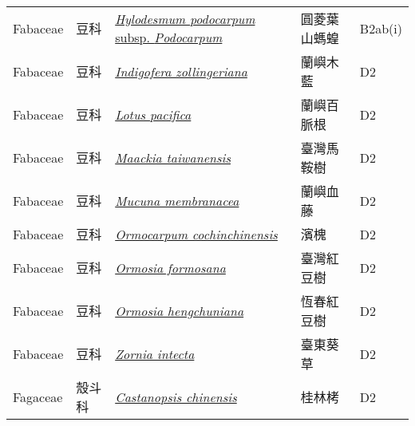 {\begin{longtable}{p{2.5cm}p{2.5cm}p{4.5cm}p{2.5cm}p{3cm}}
    Fabaceae & 豆科 & \href{http://www.theplantlist.org/tpl1.1/search?q=Hylodesmum+podocarpum+subsp.+Podocarpum}{\textit{Hylodesmum podocarpum} subsp. \textit{Podocarpum} } & 圓菱葉山螞蝗 & B2ab(i) \index{Hylodesmum@\textit{Hylodesmum}!podocarpum@\textit{podocarpum}!subsp. Podocarpum@subsp. \textit{Podocarpum}}  \index{圓菱葉山螞蝗} \\
    Fabaceae & 豆科 & \href{http://www.theplantlist.org/tpl1.1/search?q=Indigofera+zollingeriana}{\textit{Indigofera zollingeriana} } & 蘭嶼木藍 & D2 \index{Indigofera@\textit{Indigofera}!zollingeriana@\textit{zollingeriana}}  \index{蘭嶼木藍} \\
    Fabaceae & 豆科 & \href{http://www.theplantlist.org/tpl1.1/search?q=Lotus+pacifica}{\textit{Lotus pacifica} } & 蘭嶼百脈根 & D2 \index{Lotus@\textit{Lotus}!pacifica@\textit{pacifica}}  \index{蘭嶼百脈根} \\
    Fabaceae & 豆科 & \href{http://www.theplantlist.org/tpl1.1/search?q=Maackia+taiwanensis}{\textit{Maackia taiwanensis} } & 臺灣馬鞍樹 & D2 \index{Maackia@\textit{Maackia}!taiwanensis@\textit{taiwanensis}}  \index{臺灣馬鞍樹} \\
    Fabaceae & 豆科 & \href{http://www.theplantlist.org/tpl1.1/search?q=Mucuna+membranacea}{\textit{Mucuna membranacea} } & 蘭嶼血藤 & D2 \index{Mucuna@\textit{Mucuna}!membranacea@\textit{membranacea}}  \index{蘭嶼血藤} \\
    Fabaceae & 豆科 & \href{http://www.theplantlist.org/tpl1.1/search?q=Ormocarpum+cochinchinensis}{\textit{Ormocarpum cochinchinensis} } & 濱槐 & D2 \index{Ormocarpum@\textit{Ormocarpum}!cochinchinensis@\textit{cochinchinensis}}  \index{濱槐} \\
    Fabaceae & 豆科 & \href{http://www.theplantlist.org/tpl1.1/search?q=Ormosia+formosana}{\textit{Ormosia formosana} } & 臺灣紅豆樹 & D2 \index{Ormosia@\textit{Ormosia}!formosana@\textit{formosana}}  \index{臺灣紅豆樹} \\
    Fabaceae & 豆科 & \href{http://www.theplantlist.org/tpl1.1/search?q=Ormosia+hengchuniana}{\textit{Ormosia hengchuniana} } & 恆春紅豆樹 & D2 \index{Ormosia@\textit{Ormosia}!hengchuniana@\textit{hengchuniana}}  \index{恆春紅豆樹} \\
    Fabaceae & 豆科 & \href{http://www.theplantlist.org/tpl1.1/search?q=Zornia+intecta}{\textit{Zornia intecta} } & 臺東葵草 & D2 \index{Zornia@\textit{Zornia}!intecta@\textit{intecta}}  \index{臺東葵草} \\
    Fagaceae & 殼斗科 & \href{http://www.theplantlist.org/tpl1.1/search?q=Castanopsis+chinensis}{\textit{Castanopsis chinensis} } & 桂林栲 & D2 \index{Castanopsis@\textit{Castanopsis}!chinensis@\textit{chinensis}}  \index{桂林栲} \\

\end{longtable}}
